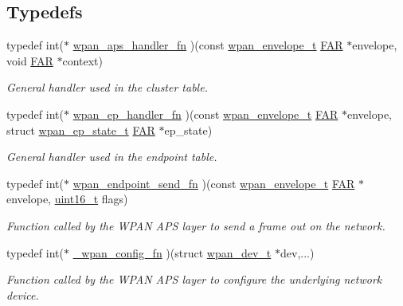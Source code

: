 \subsection*{Typedefs}
\begin{DoxyCompactItemize}
\item 
typedef int($\ast$ \hyperlink{group__wpan__aps_ga62b1036c0e296905f2d9a74e7e480297}{wpan\-\_\-aps\-\_\-handler\-\_\-fn} )(const \hyperlink{structwpan__envelope__t}{wpan\-\_\-envelope\-\_\-t} \hyperlink{group__hal_gaef060b3456fdcc093a7210a762d5f2ed}{F\-A\-R} $\ast$envelope, void \hyperlink{group__hal_gaef060b3456fdcc093a7210a762d5f2ed}{F\-A\-R} $\ast$context)
\begin{DoxyCompactList}\small\item\em General handler used in the cluster table. \end{DoxyCompactList}\item 
typedef int($\ast$ \hyperlink{group__wpan__aps_ga8e6fcd1bdbf3808368a330b9fea021e4}{wpan\-\_\-ep\-\_\-handler\-\_\-fn} )(const \hyperlink{structwpan__envelope__t}{wpan\-\_\-envelope\-\_\-t} \hyperlink{group__hal_gaef060b3456fdcc093a7210a762d5f2ed}{F\-A\-R} $\ast$envelope, struct \hyperlink{structwpan__ep__state__t}{wpan\-\_\-ep\-\_\-state\-\_\-t} \hyperlink{group__hal_gaef060b3456fdcc093a7210a762d5f2ed}{F\-A\-R} $\ast$ep\-\_\-state)
\begin{DoxyCompactList}\small\item\em General handler used in the endpoint table. \end{DoxyCompactList}\item 
typedef int($\ast$ \hyperlink{group__wpan__aps_ga66b2c3b27a4e56cd04ba2f70841e2646}{wpan\-\_\-endpoint\-\_\-send\-\_\-fn} )(const \hyperlink{structwpan__envelope__t}{wpan\-\_\-envelope\-\_\-t} \hyperlink{group__hal_gaef060b3456fdcc093a7210a762d5f2ed}{F\-A\-R} $\ast$envelope, \hyperlink{group__hal_ga5a8b2dc9e45a9ee81a94ef304fb62505}{uint16\-\_\-t} flags)
\begin{DoxyCompactList}\small\item\em Function called by the W\-P\-A\-N A\-P\-S layer to send a frame out on the network. \end{DoxyCompactList}\item 
typedef int($\ast$ \hyperlink{group__wpan__aps_ga546985b77369b8c1f90620607b3d0891}{\-\_\-wpan\-\_\-config\-\_\-fn} )(struct \hyperlink{structwpan__dev__t}{wpan\-\_\-dev\-\_\-t} $\ast$dev,...)
\begin{DoxyCompactList}\small\item\em Function called by the W\-P\-A\-N A\-P\-S layer to configure the underlying network device. \end{DoxyCompactList}\item 

\end{DoxyCompactItemize}
